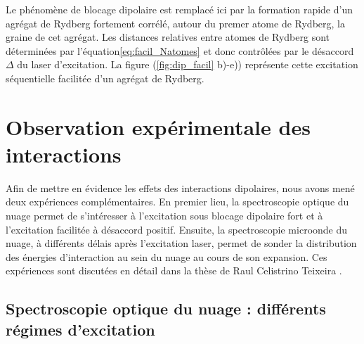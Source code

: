 Le phénomène de blocage dipolaire est remplacé ici par la formation rapide d'un \og agrégat de Rydberg \fg{} fortement corrélé, autour du premer atome de Rydberg, la \og graine \fg{} de cet agrégat.
Les distances relatives entre atomes de Rydberg sont déterminées par l'équation\eqref{eq:facil_Natomes} et donc contrôlées par le désaccord $\Delta$ du laser d'excitation.
La figure (\ref{fig:dip_facil} b)-e)) représente cette excitation séquentielle facilitée d'un agrégat de Rydberg.
%

\section{Observation expérimentale des interactions}
\noindent Afin de mettre en évidence les effets des interactions dipolaires, nous avons mené deux expériences complémentaires.
En premier lieu, la spectroscopie optique du nuage permet de s'intéresser à l'excitation sous blocage dipolaire fort et à l'excitation facilitée à désaccord positif.
Ensuite, la spectroscopie microonde du nuage, à différents délais après l'excitation laser, permet de sonder la distribution des énergies d'interaction au sein du nuage au cours de son expansion.
Ces expériences sont discutées en détail dans la thèse de Raul Celistrino Teixeira \cite{PHD_CELISTRINO}.

	\subsection{Spectroscopie optique du nuage : différents régimes d'excitation}\label{subsec:optical_spectra}
